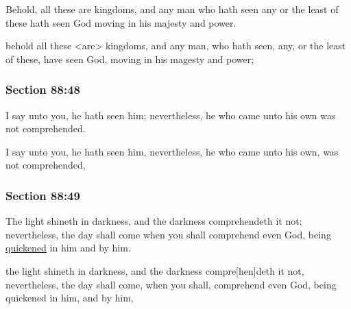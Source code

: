 		Behold, all these are kingdoms, and any man who hath seen any or the least of these hath seen God moving in his majesty and power.

		\begin{framed}
		\scriptsize
			\begin{compactdesc}
				\item[JSP] behold all these <are> kingdoms, and any man, who hath seen, any, or the least of these, have seen God, moving in his magesty and power;
			\end{compactdesc}
		\end{framed}

	\subsubsection{Section 88:48} %
		\label{DC88-48}

		I say unto you, he hath seen him; nevertheless, he who came unto his own was not comprehended.

		\begin{framed}
		\scriptsize
			\begin{compactdesc}
				\item[JSP] I say unto you, he hath seen him, nevertheless, he who came unto his own, was not comprehended,
			\end{compactdesc}
		\end{framed}

	\subsubsection{Section 88:49} %
		\label{DC88-49}

		The light shineth in darkness, and the darkness comprehendeth it not; nevertheless, the day shall come when you shall comprehend even God, being \hyperref[QUICKEN]{quickened} in him and by him.

		\begin{framed}
		\scriptsize
			\begin{compactdesc}
				\item[JSP] the light shineth in darkness, and the darkness compre[hen]deth it not, nevertheless, the day shall come, when you shall, comprehend even God, being quickened in him, and by him,
			\end{compactdesc}
		\end{framed}

